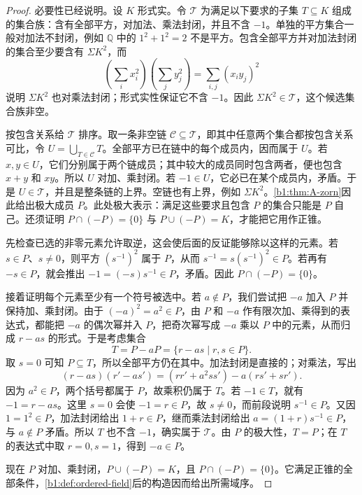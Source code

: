 \begin{proof}
	必要性已经说明。设 \(K\) 形式实。令 \(\mathcal T\) 为满足以下要求的子集 \(T\subseteq K\) 组成的集合族：含有全部平方，对加法、乘法封闭，并且不含 \(-1\)。单独的平方集合一般对加法不封闭，例如 \(\mathbb Q\) 中的 \(1^2+1^2=2\) 不是平方。包含全部平方并对加法封闭的集合至少要含有 \(\Sigma K^2\)，而
	\[
		\left(\sum_i x_i^2\right)\left(\sum_j y_j^2\right) =\sum_{i,j}(x_i y_j)^2
	\]
	说明 \(\Sigma K^2\) 也对乘法封闭；形式实性保证它不含 \(-1\)。因此 \(\Sigma K^2\in\mathcal T\)，这个候选集合族非空。

	按包含关系给 \(\mathcal T\) 排序。取一条非空链 \(\mathcal C\subseteq\mathcal T\)，即其中任意两个集合都按包含关系可比，令 \(U=\bigcup_{T\in\mathcal C}T\)。全部平方已在链中的每个成员内，因而属于 \(U\)。若 \(x,y\in U\)，它们分别属于两个链成员；其中较大的成员同时包含两者，便也包含 \(x+y\) 和 \(xy\)。所以 \(U\) 对加、乘封闭。若 \(-1\in U\)，它必已在某个成员内，矛盾。于是 \(U\in\mathcal T\)，并且是整条链的上界。空链也有上界，例如 \(\Sigma K^2\)。\cref{b1:thm:A-zorn}因此给出极大成员 \(P\)。此处极大表示：满足这些要求且包含 \(P\) 的集合只能是 \(P\) 自己。还须证明 \(P\cap(-P)=\{0\}\) 与 \(P\cup(-P)=K\)，才能把它用作正锥。

	先检查已选的非零元素允许取逆，这会使后面的反证能够除以这样的元素。若 \(s\in P\)、\(s\neq0\)，则平方 \((s^{-1})^2\) 属于 \(P\)，从而 \(s^{-1}=s(s^{-1})^2\in P\)。若再有 \(-s\in P\)，就会推出 \(-1=(-s)s^{-1}\in P\)，矛盾。因此 \(P\cap(-P)=\{0\}\)。

	接着证明每个元素至少有一个符号被选中。若 \(a\notin P\)，我们尝试把 \(-a\) 加入 \(P\) 并保持加、乘封闭。由于 \((-a)^2=a^2\in P\)，由 \(P\) 和 \(-a\) 作有限次加、乘得到的表达式，都能把 \(-a\) 的偶次幂并入 \(P\)，把奇次幂写成 \(-a\) 乘以 \(P\) 中的元素，从而归成 \(r-as\) 的形式。于是考虑集合
	\[
		T=P-aP=\{r-as\mid r,s\in P\}.
	\]
	取 \(s=0\) 可知 \(P\subseteq T\)，所以全部平方仍在其中。加法封闭是直接的；对乘法，写出
	\[
		(r-as)(r'-as')=(rr'+a^2ss')-a(rs'+sr').
	\]
	因为 \(a^2\in P\)，两个括号都属于 \(P\)，故乘积仍属于 \(T\)。若 \(-1\in T\)，就有 \(-1=r-as\)。这里 \(s=0\) 会使 \(-1=r\in P\)，故 \(s\neq0\)，而前段说明 \(s^{-1}\in P\)。又因 \(1=1^2\in P\)，加法封闭给出 \(1+r\in P\)，继而乘法封闭给出 \(a=(1+r)s^{-1}\in P\)，与 \(a\notin P\) 矛盾。所以 \(T\) 也不含 \(-1\)，确实属于 \(\mathcal T\)。由 \(P\) 的极大性，\(T=P\)；在 \(T\) 的表达式中取 \(r=0,s=1\)，得到 \(-a\in P\)。

	现在 \(P\) 对加、乘封闭，\(P\cup(-P)=K\)，且 \(P\cap(-P)=\{0\}\)。它满足正锥的全部条件，\cref{b1:def:ordered-field}后的构造因而给出所需域序。
\end{proof}

